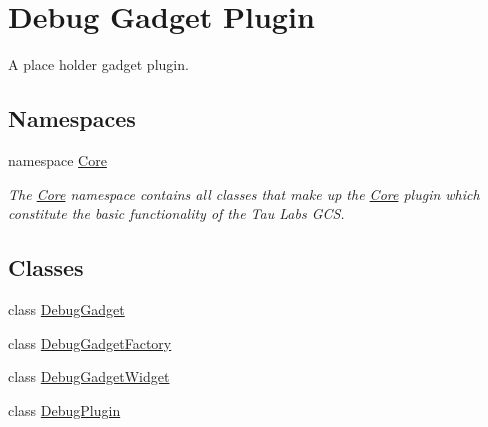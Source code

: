 \hypertarget{group___debug_gadget_plugin}{\section{Debug Gadget Plugin}
\label{group___debug_gadget_plugin}
}


A place holder gadget plugin.  


\subsection*{Namespaces}
\begin{DoxyCompactItemize}
\item 
namespace \hyperlink{namespace_core}{Core}
\begin{DoxyCompactList}\small\item\em The \hyperlink{namespace_core}{Core} namespace contains all classes that make up the \hyperlink{namespace_core}{Core} plugin which constitute the basic functionality of the Tau Labs G\-C\-S. \end{DoxyCompactList}\end{DoxyCompactItemize}
\subsection*{Classes}
\begin{DoxyCompactItemize}
\item 
class \hyperlink{class_debug_gadget}{Debug\-Gadget}
\item 
class \hyperlink{class_debug_gadget_factory}{Debug\-Gadget\-Factory}
\item 
class \hyperlink{class_debug_gadget_widget}{Debug\-Gadget\-Widget}
\item 
class \hyperlink{class_debug_plugin}{Debug\-Plugin}
\end{DoxyCompactItemize}
